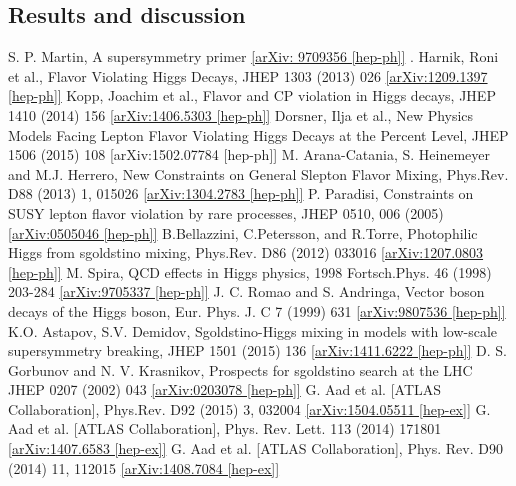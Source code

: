 \documentclass[10pt]{article}
\begin{document}
\subsection{Results and discussion}
\clearpage
\begin{thebibliography}{00}
 S. P. Martin, A supersymmetry primer \href{http://arxiv.org/abs/hep-ph/9709356}{[arXiv: 9709356 [hep-ph]]} .
 Harnik, Roni et al., Flavor Violating Higgs Decays, JHEP 1303 (2013) 026 \href{http://arxiv.org/abs/1209.1397}{[arXiv:1209.1397 [hep-ph]]}
 Kopp, Joachim et al., Flavor and CP violation in Higgs decays, JHEP 1410 (2014) 156 \href{http://arxiv.org/abs/1406.5303}{[arXiv:1406.5303 [hep-ph]]}
 Dorsner, Ilja et al., New Physics Models Facing Lepton Flavor Violating Higgs Decays at the Percent Level, JHEP 1506 (2015) 108 [arXiv:1502.07784 [hep-ph]]
 M. Arana-Catania, S. Heinemeyer and M.J. Herrero, New Constraints on General Slepton Flavor Mixing, Phys.Rev. D88 (2013) 1, 015026 \href{http://arxiv.org/abs/1304.2783}{[arXiv:1304.2783 [hep-ph]]}
 P. Paradisi, Constraints on SUSY lepton flavor violation by rare processes, JHEP 0510, 006 (2005) \href{http://arxiv.org/abs/hep-ph/0505046}{[arXiv:0505046 [hep-ph]]}
 B.Bellazzini, C.Petersson, and R.Torre, Photophilic Higgs from sgoldstino mixing, Phys.Rev. D86 (2012) 033016 \href{http://arxiv.org/abs/1207.0803}{[arXiv:1207.0803 [hep-ph]]}
 M. Spira, QCD effects in Higgs physics, 1998 Fortsch.Phys. 46 (1998) 203-284 \href{http://arxiv.org/abs/hep-ph/9705337}{[arXiv:9705337 [hep-ph]]}
 J. C. Romao and S. Andringa, Vector boson decays of the Higgs boson, Eur. Phys. J. C 7 (1999) 631 \href{http://arxiv.org/abs/hep-ph/9807536}{[arXiv:9807536 [hep-ph]]}
 K.O. Astapov, S.V. Demidov, Sgoldstino-Higgs mixing in models with low-scale supersymmetry breaking, JHEP 1501 (2015) 136 \href{http://arxiv.org/abs/1411.6222}{[arXiv:1411.6222 [hep-ph]]}
 D. S. Gorbunov and N. V. Krasnikov, Prospects for sgoldstino search at the LHC JHEP 0207 (2002) 043 \href{http://arxiv.org/abs/hep-ph/0203078}{[arXiv:0203078 [hep-ph]]}
 G. Aad et al. [ATLAS Collaboration], Phys.Rev. D92 (2015) 3, 032004 \href{http://arxiv.org/abs/1504.05511}{[arXiv:1504.05511 [hep-ex]]}
 G. Aad et al. [ATLAS Collaboration], Phys. Rev. Lett. 113 (2014) 171801 \href{http://arxiv.org/abs/1407.6583}{[arXiv:1407.6583 [hep-ex]]}
 G. Aad et al. [ATLAS Collaboration], Phys. Rev. D90 (2014) 11, 112015 \href{http://arxiv.org/abs/1408.7084}{[arXiv:1408.7084 [hep-ex]]}

\end{thebibliography}
\end{document}
